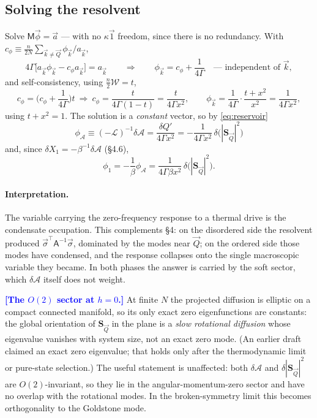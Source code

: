 \documentclass[11pt,a4paper]{article}
\newcommand{\bk}{\vec k}
\newcommand{\bQ}{\vec Q}
\newcommand{\Wc}{\mathcal{W}}
\newcommand{\FLAG}[1]{\textcolor{blue}{\textbf{[#1]}}}
\newcommand{\Ac}{\mathcal{A}}
\newcommand{\Lc}{\mathcal{L}}
\newcommand{\Mc}{\mathsf{M}}
\newcommand{\bk}{\vec k}
\newcommand{\bQ}{\vec Q}
\newcommand{\bs}{\vec\sigma}
\newcommand{\Wc}{\mathcal{W}}
\newcommand{\FLAG}[1]{\textcolor{blue}{\textbf{[#1]}}}
\begin{document}
\subsection{Solving the resolvent}
Solve $\Mc\vec\phi=\vec a$ --- with no $\kappa\vec1$ freedom, since there is no redundancy.
With $c_\phi\equiv\tfrac{n}{2N}\sum_{\bk\neq\bQ}\phi_{\bk}/a_{\bk}$,
\begin{equation}
  4\Gamma\big[a_{\bk}\phi_{\bk}-c_\phi a_{\bk}\big]=a_{\bk}
  \qquad\Longrightarrow\qquad
  \phi_{\bk}=c_\phi+\frac{1}{4\Gamma}\quad\text{--- independent of }\bk ,
\end{equation}
and self-consistency, using $\tfrac n2\Wc=t$,
\begin{equation}
  c_\phi=\Big(c_\phi+\frac{1}{4\Gamma}\Big)t
  \ \Longrightarrow\
  c_\phi=\frac{t}{4\Gamma(1-t)}=\frac{t}{4\Gamma x^{2}},
  \qquad
  \phi_{\bk}=\frac{1}{4\Gamma}\cdot\frac{t+x^{2}}{x^{2}}=\frac{1}{4\Gamma x^{2}} ,
\end{equation}
using $t+x^2=1$. The solution is a \emph{constant} vector, so by \eqref{eq:reservoir}
\begin{equation}
  \boxed{\
  \phi_{\Ac}\equiv(-\Lc)^{-1}\delta\Ac
   =\frac{\delta Q'}{4\Gamma x^{2}}
   =-\frac{1}{4\Gamma x^{2}}\,\delta\big(|\bm S_{\bQ}|^{2}\big)\ }
  \label{eq:phiord}
\end{equation}
and, since $\delta X_1=-\beta^{-1}\delta\Ac$ (\S4.6),
\begin{equation}
  \phi_1=-\frac{1}{\beta}\phi_{\Ac}=\frac{1}{4\Gamma\beta x^{2}}\,\delta\big(|\bm S_{\bQ}|^{2}\big).
  \label{eq:phi1ord}
\end{equation}

\paragraph{Interpretation.} The variable carrying the zero-frequency response to a thermal
drive is the condensate occupation. This complements \S4: on the disordered side the
resolvent produced $\bs^\top\mathsf A^{-1}\bs$, dominated by the modes near $\bQ$; on the
ordered side those modes have condensed, and the response collapses onto the single
macroscopic variable they became. In both phases the answer is carried by the soft sector,
which $\delta\Ac$ itself does not weight.

\FLAG{The $O(2)$ sector at $h=0$.} At finite $N$ the projected diffusion is elliptic on a
compact connected manifold, so its only exact zero eigenfunctions are constants: the global
orientation of $\bm S_{\bQ}$ in the plane is a \emph{slow rotational diffusion} whose
eigenvalue vanishes with system size, not an exact zero mode. (An earlier draft claimed an
exact zero eigenvalue; that holds only after the thermodynamic limit or pure-state
selection.) The useful statement is unaffected: both $\delta\Ac$ and
$\delta|\bm S_{\bQ}|^2$ are $O(2)$-invariant, so they lie in the angular-momentum-zero
sector and have no overlap with the rotational modes. In the broken-symmetry limit this
becomes orthogonality to the Goldstone mode.
\end{document}
